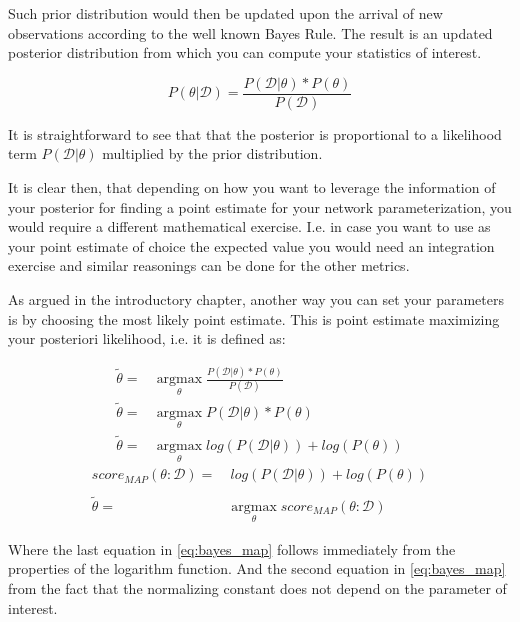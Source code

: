 \documentclass[11pt]{article}
\begin{document}
\begin{article}
Such prior distribution would then be updated upon the arrival of
new observations according to the well known Bayes Rule. The result
is an updated posterior distribution from which you can compute your
statistics of interest.


\begin{equation} \label{eq:bayes_formula}
P (\theta | \mathscr{D}) = \frac{P (\mathscr{D} | \theta) * P(\theta)}{P (\mathscr{D})} 
\end{equation}

It is straightforward to see that that the posterior is proportional
to a likelihood term \(P (\mathscr{D} | \theta)\) multiplied by the
prior distribution.

It is clear then, that depending on how you want to leverage the
information of your posterior for finding a point estimate for your
network parameterization, you would require a different
mathematical exercise. I.e. in case you want to use as your point
estimate of choice the expected value you would need an integration
exercise and similar reasonings can be done for the other metrics.

As argued in the introductory chapter, another way you can set your
parameters is by choosing the most likely point estimate. This is
point estimate maximizing your posteriori likelihood, i.e. it is
defined as:

\begin{align} \label{eq:bayes_map}
\tilde{\theta} =& \operatorname*{argmax}_{\theta} \frac{P (\mathscr{D} | \theta) * P(\theta)}{P (\mathscr{D})} \nonumber\\
\tilde{\theta} =& \operatorname*{argmax}_{\theta} P (\mathscr{D} | \theta) * P(\theta)\\ 
\tilde{\theta} =& \operatorname*{argmax}_{\theta} log (P (\mathscr{D} | \theta)) + log (P(\theta)) \nonumber
\end{align}
\begin{align} \label{eq:bayes_map2}
score_{MAP} (\theta : \mathscr{D}) =& \ log (P (\mathscr{D} | \theta)) + log (P(\theta)) \nonumber\\
\nonumber\\
\tilde{\theta} =& \operatorname*{argmax}_{\theta} score_{MAP}(\theta : \mathscr{D}) 
\end{align}

Where the last equation in \ref{eq:bayes_map} follows immediately
from the properties of the logarithm function. And the second
equation in \ref{eq:bayes_map} from the fact that the normalizing
constant does not depend on the parameter of interest.


\end{article}
\end{document}
